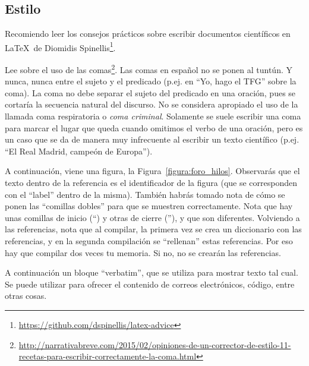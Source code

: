 \documentclass[a4paper, 12pt]{book}
\begin{document}
\subsection{Estilo}
\label{subsec:estilo}

Recomiendo leer los consejos prácticos sobre escribir documentos científicos en \LaTeX \ de Diomidis Spinellis\footnote{\url{https://github.com/dspinellis/latex-advice}}.

Lee sobre el uso de las comas\footnote{\url{http://narrativabreve.com/2015/02/opiniones-de-un-corrector-de-estilo-11-recetas-para-escribir-correctamente-la-coma.html}}. 
Las comas en español no se ponen al tuntún.
Y nunca, nunca entre el sujeto y el predicado (p.ej. en ``Yo, hago el TFG'' sobre la coma).
La coma no debe separar el sujeto del predicado en una oración, pues se cortaría la secuencia natural del discurso.
No se considera apropiado el uso de la llamada coma respiratoria o \emph{coma criminal}.
Solamente se suele escribir una coma para marcar el lugar que queda cuando omitimos el verbo de una oración, pero es un caso que se da de manera muy infrecuente al escribir un texto científico (p.ej. ``El Real Madrid, campeón de Europa'').

A continuación, viene una figura, la Figura~\ref{figura:foro_hilos}. 
Observarás que el texto dentro de la referencia es el identificador de la figura (que se corresponden con el ``label'' dentro de la misma). 
También habrás tomado nota de cómo se ponen las ``comillas dobles'' para que se muestren correctamente. 
Nota que hay unas comillas de inicio (``) y otras de cierre (''), y que son diferentes.
Volviendo a las referencias, nota que al compilar, la primera vez se crea un diccionario con las referencias, y en la segunda compilación se ``rellenan'' estas referencias. 
Por eso hay que compilar dos veces tu memoria.
Si no, no se crearán las referencias.

A continuación un bloque ``verbatim'', que se utiliza para mostrar texto tal cual.
Se puede utilizar para ofrecer el contenido de correos electrónicos, código, entre otras cosas.
\end{document}
